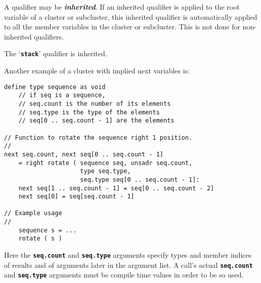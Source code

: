 \documentclass[12pt]{article}
\newcommand{\TT}[1]{{\tt \bfseries #1}}
\newcommand{\ikey}[2]{{\bf \em #1}\index{#2}}
\newenvironment{indpar}[1][0.3in]%
	{\begin{list}{}%
		     {\setlength{\itemsep}{0in}%
		      \setlength{\topsep}{0in}%
		      \setlength{\parsep}{1ex}%
		      \setlength{\labelwidth}{#1}%
		      \setlength{\leftmargin}{#1}%
		      \addtolength{\leftmargin}{\labelsep}}%
	 \item}%
	{\end{list}}
\begin{document}
A qualifier may be \ikey{inherited}{qualifier}\label{INHERITED-QUALIFIER}.
If an inherited qualifier
is applied to the root variable of a cluster
or subcluster, this inherited qualifier is automatically applied to all
the member variables in the cluster or subcluster.  This is not done
for non-inherited qualifiers.

The `\TT{stack}' qualifier is inherited.

Another example of a cluster with implied next variables is:
\begin{indpar}\begin{verbatim}
define type sequence as void
    // if seq is a sequence,
    // seq.count is the number of its elements
    // seq.type is the type of the elements
    // seq[0 .. seq.count - 1] are the elements

// Function to rotate the sequence right 1 position.
//
next seq.count, next seq[0 .. seq.count - 1]
    = right rotate ( sequence seq, unsadr seq.count,
                     type seq.type,
                     seq.type seq[0 .. seq.count - 1]:
    next seq[1 .. seq.count - 1] = seq[0 .. seq.count - 2]
    next seq[0] = seq[seq.count - 1]

// Example usage
//
    sequence s = ...
    rotate ( s )
\end{verbatim}\end{indpar}
Here the \TT{seq.count} and \TT{seq.type} arguments
specify types and member indices
of results and of arguments later in the argument list.  A call's actual
\TT{seq.count} and \TT{seq.type} arguments must be compile time values
in order to be so used.
\end{document}
